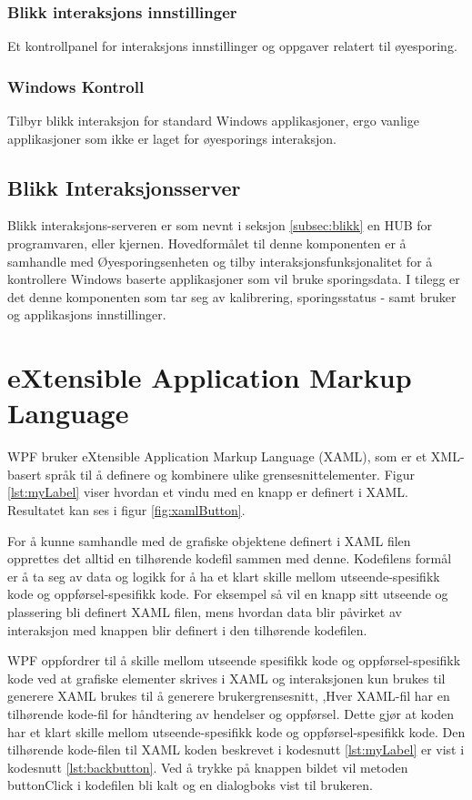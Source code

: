 \subsubsection{Blikk interaksjons innstillinger}
Et kontrollpanel for interaksjons innstillinger og oppgaver relatert til øyesporing.

\subsubsection{Windows Kontroll}
Tilbyr blikk interaksjon for standard Windows applikasjoner, ergo vanlige applikasjoner som ikke er laget for øyesporings interaksjon.


\subsection{Blikk Interaksjonsserver}

Blikk interaksjons-serveren er som nevnt i seksjon \ref{subsec:blikk} en HUB for programvaren, eller kjernen. Hovedformålet til denne komponenten er å samhandle med Øyesporingsenheten og tilby interaksjonsfunksjonalitet for å kontrollere Windows baserte applikasjoner som vil bruke sporingsdata. I tilegg er det denne komponenten som tar seg av kalibrering, sporingsstatus - samt bruker og applikasjons innstillinger.


\section{eXtensible Application Markup Language} 
 
 WPF bruker eXtensible Application Markup Language (\gls{XAML}), som er et XML-basert språk til å definere og kombinere ulike grensesnittelementer. Figur \ref{lst:myLabel} viser hvordan et vindu med en knapp er definert i XAML. Resultatet kan ses i figur \ref{fig:xamlButton}.  
 
 
For å kunne samhandle med de grafiske objektene definert i XAML filen opprettes det alltid en tilhørende kodefil sammen med denne. Kodefilens formål er å ta seg av data og logikk for å ha et klart skille mellom utseende-spesifikk kode og oppførsel-spesifikk kode. For eksempel så vil en knapp sitt utseende og plassering bli definert XAML filen, mens hvordan data blir påvirket av interaksjon med knappen blir definert i den tilhørende kodefilen. 
 
WPF oppfordrer til å skille mellom utseende spesifikk kode og oppførsel-spesifikk kode ved at grafiske elementer skrives i XAML og interaksjonen  kun brukes til generere  
XAML brukes til å generere brukergrensesnitt,  
,Hver XAML-fil har en tilhørende kode-fil for håndtering av hendelser og oppførsel. Dette gjør at koden har et klart skille mellom utseende-spesifikk kode og oppførsel-spesifikk kode. Den tilhørende kode-filen til XAML koden beskrevet i kodesnutt \ref{lst:myLabel} er vist i kodesnutt \ref{lst:backbutton}. Ved å trykke på knappen bildet vil metoden button\textunderscore Click i kodefilen bli kalt og en dialogboks vist til brukeren. 
 
